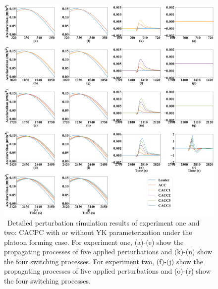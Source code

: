 \documentclass[a4paper,fleqn]{cas-sc}
\begin{document}
\begin{figure}
  \centering
  \includegraphics[width=14cm]{figs/form_detail.png}
  \caption{~Detailed perturbation simulation results of experiment one and two: CACPC with or without YK parameterization under the platoon forming case. For experiment one, (a)-(e) show the propagating processes of five applied perturbations and (k)-(n) show the four switching processes. For experiment two, (f)-(j) show the propagating processes of five applied perturbations and (o)-(r) show the four switching processes.}
  \label{new2}
\end{figure}
\end{document}
